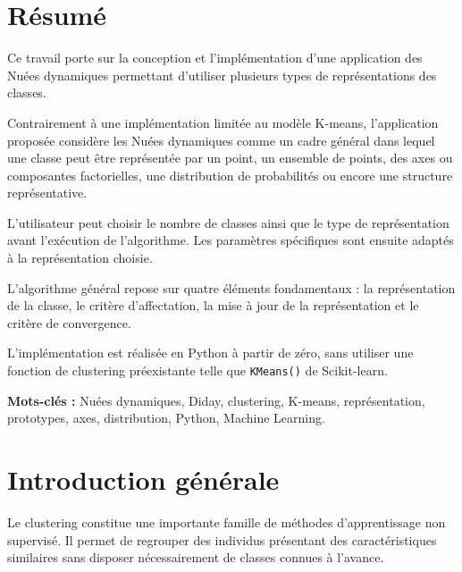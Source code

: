 \documentclass[12pt,a4paper]{report}
\begin{document}
\tableofcontents

\newpage


\chapter*{Résumé}

Ce travail porte sur la conception et l'implémentation d'une
application des Nuées dynamiques permettant d'utiliser plusieurs
types de représentations des classes.

Contrairement à une implémentation limitée au modèle K-means,
l'application proposée considère les Nuées dynamiques comme un cadre
général dans lequel une classe peut être représentée par un point,
un ensemble de points, des axes ou composantes factorielles, une
distribution de probabilités ou encore une structure représentative.

L'utilisateur peut choisir le nombre de classes ainsi que le type
de représentation avant l'exécution de l'algorithme. Les paramètres
spécifiques sont ensuite adaptés à la représentation choisie.

L'algorithme général repose sur quatre éléments fondamentaux :
la représentation de la classe, le critère d'affectation, la mise à
jour de la représentation et le critère de convergence.

L'implémentation est réalisée en Python à partir de zéro, sans utiliser
une fonction de clustering préexistante telle que \texttt{KMeans()} de
Scikit-learn.

\textbf{Mots-clés :} Nuées dynamiques, Diday, clustering,
K-means, représentation, prototypes, axes, distribution,
Python, Machine Learning.


\chapter*{Introduction générale}

Le clustering constitue une importante famille de méthodes
d'apprentissage non supervisé. Il permet de regrouper des individus
présentant des caractéristiques similaires sans disposer nécessairement
de classes connues à l'avance.
\end{document}
